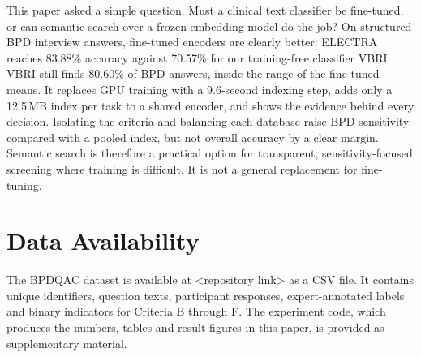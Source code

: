 \documentclass[11pt]{article}
\newcommand{\vbri}{VBRI}
\newcommand{\bpdqac}{BPDQAC}
\begin{document}
This paper asked a simple question. Must a clinical text classifier be fine-tuned, or can semantic
search over a frozen embedding model do the job? On structured BPD interview answers, fine-tuned
encoders are clearly better: ELECTRA reaches 83.88\% accuracy against 70.57\% for our training-free
classifier \vbri{}. \vbri{} still finds 80.60\% of BPD answers, inside the range of the fine-tuned
means. It replaces GPU training with a 9.6-second indexing step, adds only a 12.5\,MB index per task
to a shared encoder, and shows the evidence behind every decision. Isolating the criteria and
balancing each database raise BPD sensitivity compared with a pooled index, but not overall accuracy
by a clear margin. Semantic search is therefore a practical option for transparent,
sensitivity-focused screening where training is difficult. It is not a general replacement for
fine-tuning.

\section*{Data Availability}

The \bpdqac{} dataset is available at \textless{}repository link\textgreater{} as a CSV file. It
contains unique identifiers, question texts, participant responses, expert-annotated labels and
binary indicators for Criteria B through F. The experiment code, which produces the numbers, tables
and result figures in this paper, is provided as supplementary material.

\printbibliography
\end{document}
